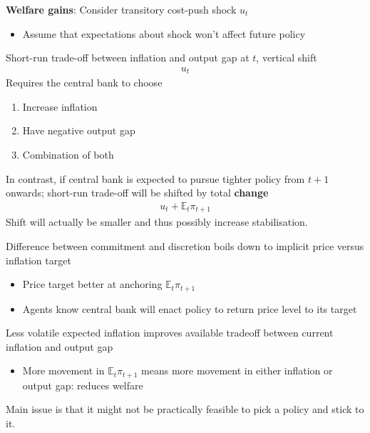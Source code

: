 \documentclass{beamer}
\begin{document}
\begin{frame}
  \textbf{Welfare gains}: Consider transitory cost-push shock $u_t$
  \begin{itemize}
    \item Assume that expectations about shock won't affect future policy
  \end{itemize}
  \medskip
    Short-run trade-off between inflation and output gap at $t$, vertical shift
    \begin{align}
       u_t
     \end{align} 
\medskip
Requires the central bank to choose
\begin{enumerate}
  \item Increase inflation
  \item Have negative output gap
  \item Combination of both
\end{enumerate}
\end{frame}

\begin{frame}
 In contrast, if central bank is expected to pursue tighter policy from $t+1$ onwards; short-run trade-off will be shifted by total \textbf{change}
  \begin{align}
   u_t+\mathbb{E}_t\pi_{t+1} 
  \end{align}
  \medskip
  Shift will actually be smaller and thus possibly increase stabilisation. 
\end{frame}

\begin{frame}
  Difference between commitment and discretion boils down to implicit price versus inflation target
  \begin{itemize}
    \item Price target better at anchoring $\mathbb{E}_t\pi_{t+1}$
    \item Agents know central bank will enact policy to return price level to its target      
  \end{itemize}
  \medskip
  Less volatile expected inflation improves available tradeoff between current inflation and output gap
  \begin{itemize}
    \item More movement in $\mathbb{E}_t\pi_{t+1}$ means more movement in either inflation or output gap: reduces welfare
  \end{itemize}
  \medskip
  Main issue is that it might not be practically feasible to pick a policy and stick to it.   
\end{frame}
\end{document}
